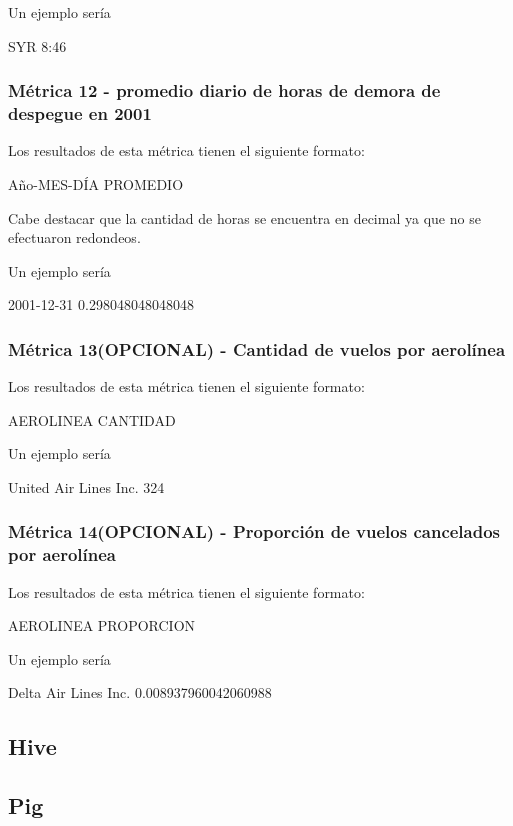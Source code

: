 \documentclass[a4paper,10pt]{article}
\begin{document}
            Un ejemplo sería\\
            \begin{center}
                SYR  8:46\\
            \end{center}

 \subsubsection{Métrica 12 - promedio diario de horas de demora de despegue en 2001}
            Los resultados de esta métrica tienen el siguiente formato:\\
            \begin{center}
                Año-MES-DÍA PROMEDIO
            \end{center}
            Cabe destacar que la cantidad de horas se encuentra en decimal ya que no se efectuaron redondeos.

            Un ejemplo sería\\
            \begin{center}
                2001-12-31  0.298048048048048\\
            \end{center}

        \subsubsection{Métrica 13(OPCIONAL) - Cantidad de vuelos por aerolínea}
            Los resultados de esta métrica tienen el siguiente formato:\\
            \begin{center}
                AEROLINEA CANTIDAD\\
            \end{center}

            Un ejemplo sería\\
            \begin{center}
               United Air Lines Inc.   324\\
            \end{center}

         \subsubsection{Métrica 14(OPCIONAL) - Proporción de vuelos cancelados por aerolínea}
            Los resultados de esta métrica tienen el siguiente formato:\\
            \begin{center}
                AEROLINEA PROPORCION\\
            \end{center}

            Un ejemplo sería\\
            \begin{center}
               Delta Air Lines Inc.    0.008937960042060988\\
            \end{center}

    \subsection{Hive}

    \subsection{Pig}
\end{document}
